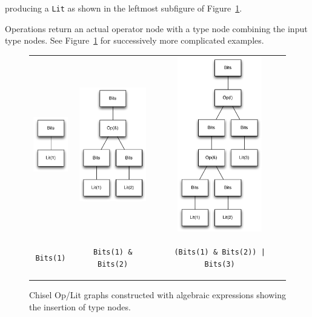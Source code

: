 \documentclass[10pt,twocolumn]{article}
\newcommand{\kode}[1]{\begin{footnotesize}{\tt #1}\end{footnotesize}}
\def\code#1{{\small\tt #1}}
\begin{document}
\noindent
producing a \code{Lit} as shown in the
leftmost subfigure of Figure~\ref{fig:bits-expressions}.

Operations return an actual operator node with a type node combining
the input type nodes.  See Figure~\ref{fig:bits-expressions} for
successively more complicated examples.

\begin{figure}
\begin{center}
\begin{tabular}{ccc}
\includegraphics[height=0.94in]{figs/bits-1.pdf} &
\includegraphics[height=1.96in]{figs/bits-and.pdf} &
\includegraphics[height=3.0in]{figs/bits-or-and.pdf} \\
\kode{Bits(1)} & \kode{Bits(1) \& Bits(2)} &
\kode{(Bits(1) \& Bits(2)) | Bits(3)} \\
\end{tabular}
\end{center}
\caption{Chisel Op/Lit graphs constructed with algebraic expressions
  showing the insertion of type nodes.}
\label{fig:bits-expressions}
\end{figure}
\end{document}
